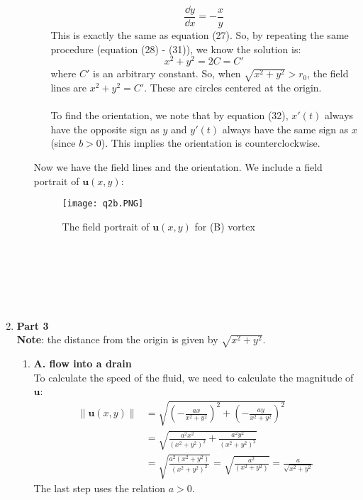\documentclass{article}
\begin{document}
\begin{enumerate}
\begin{enumerate}
\begin{enumerate}
\begin{equation}
  \end{equation}
  \begin{equation}
    \frac{\dd y}{\dd x} = - \frac{x}{y}
  \end{equation}
  This is exactly the same as equation (27). So, by repeating the same procedure (equation (28) - (31)), we know the solution is:
  \begin{equation}
    x^2+y^2 =2C =C'
  \end{equation}
  where \(C'\) is an arbitrary constant. So, when \(\sqrt{x^2+y^2} > r_0\), the field lines are
  \(x^2+y^2 =C'\). These are circles centered at the origin.\\
  \\
  To find the orientation, we note that by equation (32), \(x'(t)\) always have the opposite sign as \(y\)
  and \(y'(t)\) always have the same sign as \(x\) (since \(b >0\)). This implies the orientation is counterclockwise.
\end{enumerate}
Now we have the field lines and the orientation. We include a field portrait of \(\mathbf{u}(x,y)\):
\begin{figure}[ht]
    \centering
    \texttt{[image: q2b.PNG]}
    \caption{The field portrait of \(\mathbf{u}(x,y)\) for (B) vortex}
    \label{fig:label}
\end{figure}\\
\end{enumerate}\text{ }\\
\pagebreak \\ \\
\item \textbf{Part 3}\\
\textbf{Note}: the distance from the origin is given by \(\sqrt{x^2+y^2}\).
  \begin{enumerate}
    \item \textbf{A. flow into a drain}\\
    To calculate the speed of the fluid, we need to calculate the magnitude of \(\mathbf{u}\):
    \begin{align*}
      \|\mathbf{u}(x,y)\|
      &= \sqrt{\left(-\frac{ax}{x^2+y^2}\right)^2 + \left(-\frac{ay}{x^2+y^2}\right)^2}\\
      &= \sqrt{\frac{a^2x^2}{(x^2+y^2)^2} + \frac{a^2y^2}{(x^2+y^2)^2}}\\
      &= \sqrt{\frac{a^2(x^2+y^2)}{(x^2+y^2)^2}} = \sqrt{\frac{a^2}{(x^2+y^2)}} = \frac{a}{\sqrt{x^2+y^2}}
    \end{align*}
    The last step uses the relation \(a>0\).

\end{enumerate}
\end{enumerate}
\end{document}

